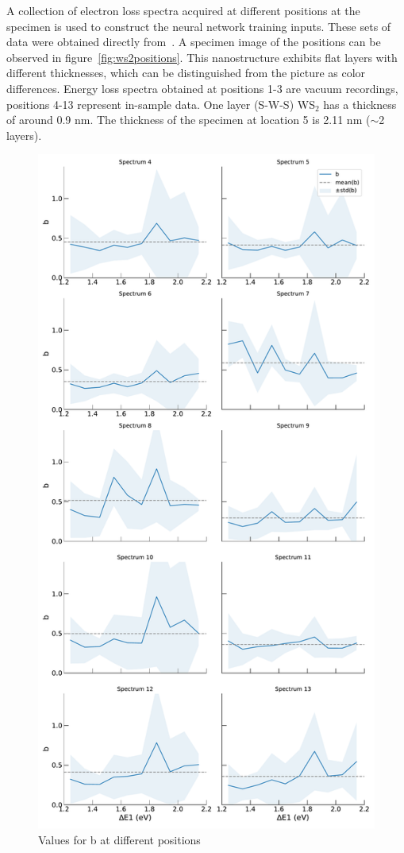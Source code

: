 %
A collection of electron loss spectra acquired at different positions 
at the specimen is used to construct the neural network training inputs. 
%
These sets of data were obtained directly from~\cite{SabryaWS2}.
%
A specimen image of the positions can be observed in figure~\ref{fig:ws2positions}.  
This nanostructure exhibits flat layers with different thicknesses, which 
can be distinguished from the picture as color differences.
%
Energy loss spectra obtained at positions 1-3 are vacuum recordings, 
positions 4-13 represent in-sample data.
%
One layer (S-W-S) WS$_2$ has a thickness of around 0.9 nm. 
The thickness of the specimen at location 5 is 2.11 nm ($\sim$2 layers).
%
\begin{figure}[ht]
\begin{centering}
\includegraphics[width=0.6\linewidth]{plots/bvalues.pdf} 
\caption{Values for b at different positions}
\label{fig:bvalues}
\end{centering}
\end{figure}

